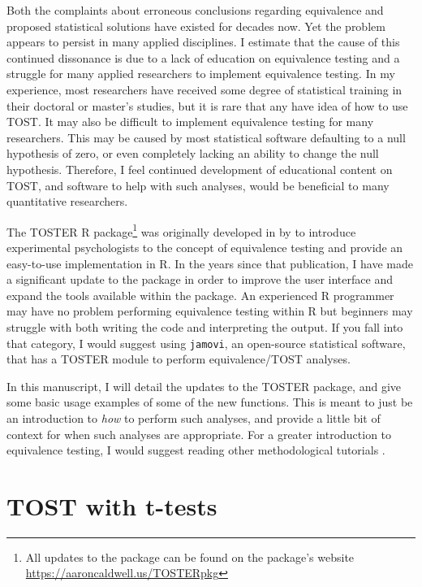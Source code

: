 \documentclass[]{interact}
\theoremstyle{plain}%
\theoremstyle{definition}
\theoremstyle{remark}
\begin{document}
Both the complaints about erroneous conclusions regarding equivalence
\citep{blandaltman95} and proposed statistical solutions
\citep{schuirmann1987} have existed for decades now. Yet the problem
appears to persist in many applied disciplines. I estimate that the
cause of this continued dissonance is due to a lack of education on
equivalence testing and a struggle for many applied researchers to
implement equivalence testing. In my experience, most researchers have
received some degree of statistical training in their doctoral or
master's studies, but it is rare that any have idea of how to use TOST.
It may also be difficult to implement equivalence testing for many
researchers. This may be caused by most statistical software defaulting
to a null hypothesis of zero, or even completely lacking an ability to
change the null hypothesis. Therefore, I feel continued development of
educational content on TOST, and software to help with such analyses,
would be beneficial to many quantitative researchers.

The TOSTER R package\footnote{All updates to the package can be found on
  the package's website \url{https://aaroncaldwell.us/TOSTERpkg}} was
originally developed in by \citet{lakens_ori} to introduce experimental
psychologists to the concept of equivalence testing and provide an
easy-to-use implementation in R. In the years since that publication, I
have made a significant update to the package in order to improve the
user interface and expand the tools available within the package. An
experienced R programmer may have no problem performing equivalence
testing within R but beginners may struggle with both writing the code
and interpreting the output. If you fall into that category, I would
suggest using \texttt{jamovi}, an open-source statistical software, that
has a TOSTER module to perform equivalence/TOST analyses.

In this manuscript, I will detail the updates to the TOSTER package, and
give some basic usage examples of some of the new functions. This is
meant to just be an introduction to \emph{how} to perform such analyses,
and provide a little bit of context for when such analyses are
appropriate. For a greater introduction to equivalence testing, I would
suggest reading other methodological tutorials
\citep{lakens_ori, lakens2018equivalence, lakens2020improving, mazzolari2022myths}.

\hypertarget{tost-with-t-tests}{%
\section{TOST with t-tests}\label{tost-with-t-tests}}
\end{document}
